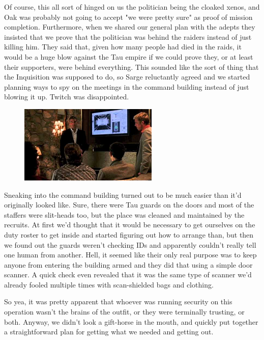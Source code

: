 Of course, this all sort of hinged on us the politician being the cloaked xenos, and Oak was probably not going to accept "we were pretty sure" as proof of mission completion. 
Furthermore, when we shared our general plan with the adepts they insisted that we prove that the politician was behind the raiders instead of just killing him. 
They said that, given how many people had died in the raids, it would be a huge blow against the Tau empire if we could prove they, or at least their supporters, were behind everything. 
This sounded like the sort of thing that the Inquisition was supposed to do, so Sarge reluctantly agreed and we started planning ways to spy on the meetings in the command building instead of just blowing it up. 
Twitch was disappointed.

\begin{figure}
	\begin{center}
		\includegraphics[width=\figwidth]{pics/10/50.png}
	\end{center}
\end{figure}
Sneaking into the command building turned out to be much easier than it'd originally looked like. 
Sure, there were Tau guards on the doors and most of the staffers were slit-heads too, but the place was cleaned and maintained by the recruits. 
At first we'd thought that it would be necessary to get ourselves on the duty roster to get inside and started figuring out how to arrange than, but then we found out the guards weren't checking IDs and apparently couldn't really tell one human from another. 
Hell, it seemed like their only real purpose was to keep anyone from entering the building armed and they did that using a simple door scanner. 
A quick check even revealed that it was the same type of scanner we'd already fooled multiple times with scan-shielded bags and clothing.

So yea, it was pretty apparent that whoever was running security on this operation wasn't the brains of the outfit, or they were terminally trusting, or both. 
Anyway, we didn't look a gift-horse in the mouth, and quickly put together a straightforward plan for getting what we needed and getting out. 


